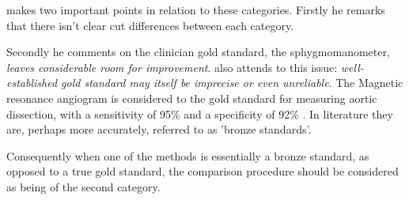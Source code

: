 \documentclass[Chap1bmain.tex]{subfiles}
\begin{document}
\bigskip
\citet{DunnSEME} makes two important points in relation to these
categories. Firstly he remarks that there isn't clear cut
differences between each category.

Secondly he comments on the clinician gold standard, the
sphygmomanometer, \emph{leaves considerable room for improvement}.
\citet{pizzi} also attends to this issue: \emph{well-established
	gold standard may itself be imprecise or even unreliable}.
\bigskip
The Magnetic resonance angiogram is considered to the gold
standard for measuring aortic dissection, with a sensitivity of
95\% and a specificity of 92\% . \citep{ACR}
\bigskip
In literature they are, perhaps more accurately, referred to as
'bronze standards'.
\bigskip

Consequently when one of the methods is essentially a bronze
standard, as opposed to a true gold standard, the comparison
procedure should be considered as being of the second category.
\end{document}
